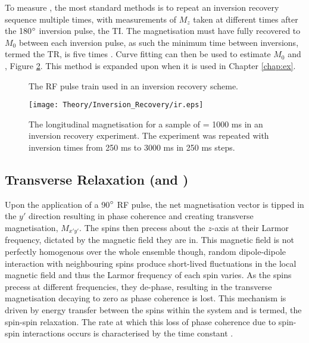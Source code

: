 To measure \tone, the most standard methods is to repeat an inversion recovery sequence multiple times, with measurements of $M_z$ taken at different times after the 180$\degree$ inversion pulse, the \ac{TI}. The magnetisation must have fully recovered to $M_0$ between each inversion pulse, as such the minimum time between inversions, termed the \ac{TR}, is five times \tone. Curve fitting can then be used to estimate $M_0$ and \tone, Figure \ref{fig:theory_inversion_recovery}.
This method is expanded upon when it is used in Chapter \ref{chap:ex}.
\begin{figure}[H]
	\centering
	\caption{The \ac{RF} pulse train used in an inversion recovery scheme.}
	\label{fig:theory_inversion_recovery_psd}	
\end{figure}

\begin{figure}[H]
	\centering
	\texttt{[image: Theory/Inversion\_Recovery/ir.eps]}
	\caption{The longitudinal magnetisation for a sample of \tone = 1000 ms in an inversion recovery experiment. The experiment was repeated with inversion times from 250 ms to 3000 ms in 250 ms steps.}
	\label{fig:theory_inversion_recovery}	
\end{figure}
\subsection{Transverse Relaxation (\ttwo and \ttwostar)}
\label{subsec:theory_t2}
Upon the application of a 90$\degree$ \ac{RF} pulse, the net magnetisation vector is tipped in the $y'$ direction resulting in phase coherence and creating transverse magnetisation, $M_{x'y'}$. The spins then precess about the $z$-axis at their Larmor frequency, dictated by the magnetic field they are in. This magnetic field is not perfectly homogenous over the whole ensemble though, random dipole-dipole interaction with neighbouring spins produce short-lived fluctuations in the local magnetic field and thus the Larmor frequency of each spin varies. As the spins precess at different frequencies, they de-phase, resulting in the transverse magnetisation decaying to zero as phase coherence is lost. This mechanism is driven by energy transfer between the spins within the system and is termed, the spin-spin relaxation. The rate at which this loss of phase coherence due to spin-spin interactions occurs is characterised by the time constant \ttwo.

